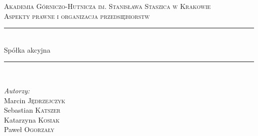 \documentclass[a4paper, 11pt]{article}
\begin{document}
	
	\begin{titlepage}
	
	
		
		\newcommand{\HRule}{\rule{\linewidth}{0.5mm}} %
		
		\center %
		
		
		\textsc{\LARGE Akademia Górniczo-Hutnicza im. Stanisława Staszica w Krakowie}\\[1.5cm] %
		\textsc{\Large Aspekty prawne i organizacja przedsiębiorstw}\\[1.5cm]
		
		
		\HRule \\[0.4cm]
		{\fontsize{38}{50}\selectfont Spółka akcyjna}
		\HRule \\[5.5cm]
		
		

\begin{minipage}{0.4\textwidth}
\begin{flushleft} \large 
\emph{Autorzy:}\\
Marcin \textsc{Jędrzejczyk}\\ %
		Sebastian \textsc{Katszer}\\ %
		Katarzyna \textsc{Kosiak} \\ %
		Paweł	  \textsc{Ogorzały} \\


\end{flushleft}
\end{minipage}
\end{titlepage}
\end{document}
